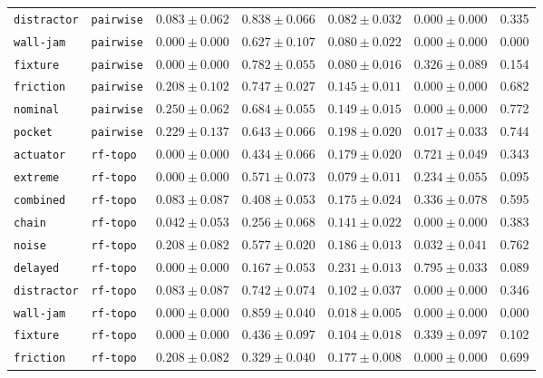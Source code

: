 \documentclass{article}
\begin{document}
\begin{center}
\begin{tabular}{llccccc}
\texttt{distractor} & \texttt{pairwise} & $0.083 \pm 0.062$ & $0.838 \pm 0.066$ & $0.082 \pm 0.032$ & $0.000 \pm 0.000$ & 0.335 \\
\texttt{wall-jam} & \texttt{pairwise} & $0.000 \pm 0.000$ & $0.627 \pm 0.107$ & $0.080 \pm 0.022$ & $0.000 \pm 0.000$ & 0.000 \\
\texttt{fixture} & \texttt{pairwise} & $0.000 \pm 0.000$ & $0.782 \pm 0.055$ & $0.080 \pm 0.016$ & $0.326 \pm 0.089$ & 0.154 \\
\texttt{friction} & \texttt{pairwise} & $0.208 \pm 0.102$ & $0.747 \pm 0.027$ & $0.145 \pm 0.011$ & $0.000 \pm 0.000$ & 0.682 \\
\texttt{nominal} & \texttt{pairwise} & $0.250 \pm 0.062$ & $0.684 \pm 0.055$ & $0.149 \pm 0.015$ & $0.000 \pm 0.000$ & 0.772 \\
\texttt{pocket} & \texttt{pairwise} & $0.229 \pm 0.137$ & $0.643 \pm 0.066$ & $0.198 \pm 0.020$ & $0.017 \pm 0.033$ & 0.744 \\
\texttt{actuator} & \texttt{rf-topo} & $0.000 \pm 0.000$ & $0.434 \pm 0.066$ & $0.179 \pm 0.020$ & $0.721 \pm 0.049$ & 0.343 \\
\texttt{extreme} & \texttt{rf-topo} & $0.000 \pm 0.000$ & $0.571 \pm 0.073$ & $0.079 \pm 0.011$ & $0.234 \pm 0.055$ & 0.095 \\
\texttt{combined} & \texttt{rf-topo} & $0.083 \pm 0.087$ & $0.408 \pm 0.053$ & $0.175 \pm 0.024$ & $0.336 \pm 0.078$ & 0.595 \\
\texttt{chain} & \texttt{rf-topo} & $0.042 \pm 0.053$ & $0.256 \pm 0.068$ & $0.141 \pm 0.022$ & $0.000 \pm 0.000$ & 0.383 \\
\texttt{noise} & \texttt{rf-topo} & $0.208 \pm 0.082$ & $0.577 \pm 0.020$ & $0.186 \pm 0.013$ & $0.032 \pm 0.041$ & 0.762 \\
\texttt{delayed} & \texttt{rf-topo} & $0.000 \pm 0.000$ & $0.167 \pm 0.053$ & $0.231 \pm 0.013$ & $0.795 \pm 0.033$ & 0.089 \\
\texttt{distractor} & \texttt{rf-topo} & $0.083 \pm 0.087$ & $0.742 \pm 0.074$ & $0.102 \pm 0.037$ & $0.000 \pm 0.000$ & 0.346 \\
\texttt{wall-jam} & \texttt{rf-topo} & $0.000 \pm 0.000$ & $0.859 \pm 0.040$ & $0.018 \pm 0.005$ & $0.000 \pm 0.000$ & 0.000 \\
\texttt{fixture} & \texttt{rf-topo} & $0.000 \pm 0.000$ & $0.436 \pm 0.097$ & $0.104 \pm 0.018$ & $0.339 \pm 0.097$ & 0.102 \\
\texttt{friction} & \texttt{rf-topo} & $0.208 \pm 0.082$ & $0.329 \pm 0.040$ & $0.177 \pm 0.008$ & $0.000 \pm 0.000$ & 0.699 \\

\end{tabular}
\end{center}
\end{document}
